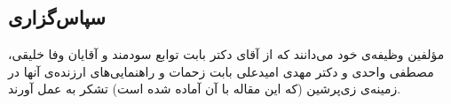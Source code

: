 \documentclass[conference]{IEEEtran-ModifiedForMVIP}
\begin{document}
\subsection*{سپاس‌گزاری}
مؤلفین وظیفه‌ی خود می‌دانند که از آقای دکتر  بابت توابع سودمند  
و آقایان وفا خلیقی، مصطفی واحدی و دکتر مهدی امیدعلی بابت زحمات و راهنمایی‌های ارزنده‌ی آنها در زمینه‌ی
زی‌پرشین (که این مقاله با آن آماده شده است) تشکر به عمل آورند. 



{
\small %
\renewcommand{\refname}{\rl{مراجع\hfill}}

}
\end{document}
